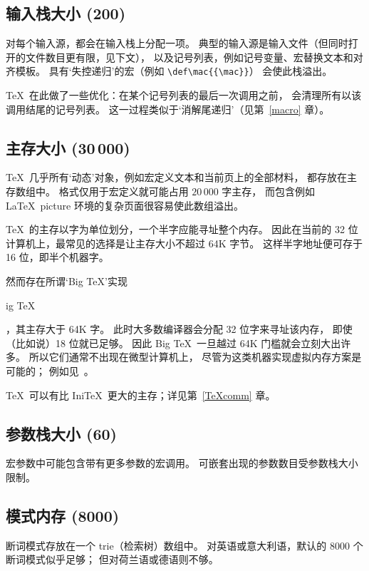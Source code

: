 \documentclass[a4paper]{rapport3}
\def\IniTeX{Ini\TeX}\def\LamsTeX{LAMS\TeX}\def\VirTeX{Vir\TeX}
\def\term#1\par{\index{#1}}
\begin{document}
\subsection{输入栈大小 {\rm(200)}}

对每个输入源，都会在输入栈上分配一项。
典型的输入源是输入文件（但同时打开的文件数目更有限，见下文），
以及记号列表，例如记号变量、宏替换文本和对齐模板。
具有`失控递归'的宏（例如 \verb>\def\mac{{\mac}}>）
会使此栈溢出。

\TeX\ 在此做了一些优化：在某个记号列表的最后一次调用之前，
会清理所有以该调用结尾的记号列表。
这一过程类似于`消解尾递归'（见第~\ref{macro} 章）。

\subsection{主存大小 (30$\,$000)}

\TeX\ 几乎所有`动态'对象，例如宏定义文本和当前页上的全部材料，
都存放在主存数组中。
格式仅用于宏定义就可能占用 $20\,000$ 字主存，
而包含例如 \LaTeX\ picture 环境的复杂页面很容易使此数组溢出。

\TeX\ 的主存以字为单位划分，一个半字应能寻址整个内存。
因此在当前的 32 位计算机上，最常见的选择是让主存大小不超过 64K 字节。
这样半字地址便可存于 16 位，即半个机器字。

然而存在所谓`Big \TeX'实现
\term big \TeX\par
，其主存大于 64K 字。
此时大多数编译器会分配 32 位字来寻址该内存，
即使（比如说）18 位就已足够。
因此 Big \TeX\ 一旦越过 64K 门槛就会立刻大出许多。
所以它们通常不出现在微型计算机上，
尽管为这类机器实现虚拟内存方案是可能的；
例如见~\cite{Thull}。

\TeX\ 可以有比 \IniTeX\ 更大的主存；详见第~\ref{TeXcomm} 章。

\subsection{参数栈大小 {\rm(60)}}

宏参数中可能包含带有更多参数的宏调用。
可嵌套出现的参数数目受参数栈大小限制。

\subsection{模式内存 {\rm(8000)}}

断词模式存放在一个 trie（检索树）数组中。
对英语或意大利语，默认的 8000 个断词模式似乎足够；
但对荷兰语或德语则不够。
\end{document}
